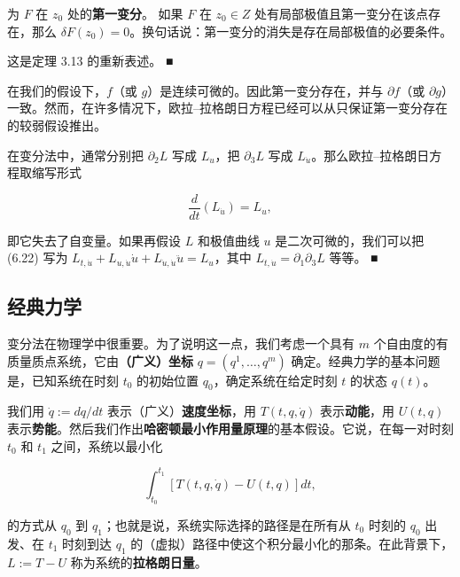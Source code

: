 \begin{remark}
\begin{items}
为 $ F $ 在 $ z_{0} $ 处的\textbf{第一变分}。
如果 $ F $ 在 $ z_{0} \in Z $ 处有局部极值且第一变分在该点存在，那么 $ \delta F(z_{0}) = 0 $。换句话说：第一变分的消失是存在局部极值的必要条件。

\proofhead
这是定理 3.13 的重新表述。 \nobreak\hspace{0.35em}■
\item

在我们的假设下，$ f $（或 $ g $）是连续可微的。因此第一变分存在，并与 $ \partial f $（或 $ \partial g $）一致。然而，在许多情况下，欧拉–拉格朗日方程已经可以从只保证第一变分存在的较弱假设推出。

\item

在变分法中，通常分别把 $ \partial_{2}L $ 写成 $ L_{u} $，把 $ \partial_{3}L $ 写成 $ L_{\dot{u}} $。那么欧拉–拉格朗日方程取缩写形式

\begin{equation}
\frac{d}{dt}(L_{\dot{u}}) = L_{u} ,\tag{6.22}
\end{equation}

即它失去了自变量。如果再假设 $ L $ 和极值曲线 $ u $ 是二次可微的，我们可以把 (6.22) 写为 $ L_{t,\dot{u}} + L_{u,\dot{u}}\dot{u} + L_{\dot{u},\dot{u}}\ddot{u} = L_{u} $，其中 $ L_{t,\dot{u}} = \partial_{1}\partial_{3}L $ 等等。 \nobreak\hspace{0.35em}■

\end{items}

\end{remark}

\subsection*{经典力学}

变分法在物理学中很重要。为了说明这一点，我们考虑一个具有 $ m $ 个自由度的有质量质点系统，它由\textbf{（广义）坐标} $ q = (q^{1}, \ldots, q^{m}) $ 确定。经典力学的基本问题是，已知系统在时刻 $ t_{0} $ 的初始位置 $ q_{0} $，确定系统在给定时刻 $ t $ 的状态 $ q(t) $。

我们用 $ \dot{q} := dq/dt $ 表示（广义）\textbf{速度坐标}，用 $ T(t, q, \dot{q}) $ 表示\textbf{动能}，用 $ U(t, q) $ 表示\textbf{势能}。然后我们作出\textbf{哈密顿最小作用量原理}的基本假设。它说，在每一对时刻 $ t_{0} $ 和 $ t_{1} $ 之间，系统以最小化

\[
\int_{t_{0}}^{t_{1}}[T(t, q, \dot{q}) - U(t, q)] dt ,
\]

的方式从 $ q_{0} $ 到 $ q_{1} $；也就是说，系统实际选择的路径是在所有从 $ t_{0} $ 时刻的 $ q_{0} $ 出发、在 $ t_{1} $ 时刻到达 $ q_{1} $ 的（虚拟）路径中使这个积分最小化的那条。在此背景下，$ L := T - U $ 称为系统的\textbf{拉格朗日量}。

